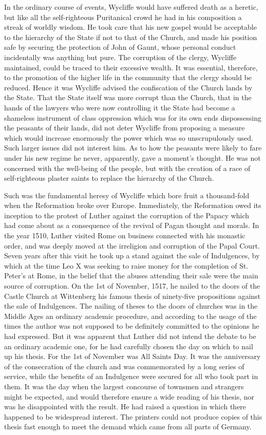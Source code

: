 \documentclass{book}
\begin{document}
In the ordinary course of events, Wycliffe would have suffered death as a heretic, but like all the self-righteous Puritanical crowd he had in his composition a streak of worldly wisdom. He took care that his new gospel would be acceptable to the hierarchy of the State if not to that of the Church, and made his position safe by securing the protection of John of Gaunt, whose personal conduct incidentally was anything but pure. The corruption of the clergy, Wycliffe maintained, could be traced to their excessive wealth. It was essential, therefore, to the promotion of the higher life in the community that the clergy should be reduced. Hence it was Wycliffe advised the confiscation of the Church lands by the State. That the State itself was more corrupt than the Church, that in the hands of the lawyers who were now controlling it the State had become a shameless instrument of class oppression which was for its own ends dispossessing the peasants of their lands, did not deter Wycliffe from proposing a measure which would increase enormously the power which was so unscrupulously used. Such larger issues did not interest him. As to how the peasants were likely to fare under his new regime he never, apparently, gave a moment’s thought. He was not concerned with the well-being of the people, but with the creation of a race of self-righteous plaster saints to replace the hierarchy of the Church.

Such was the fundamental heresy of Wycliffe which bore fruit a thousand-fold when the Reformation broke over Europe. Immediately, the Reformation owed its inception to the protest of Luther against the corruption of the Papacy which had come about as a consequence of the revival of Pagan thought and morals. In the year 1510, Luther visited Rome on business connected with his monastic order, and was deeply moved at the irreligion and corruption of the Papal Court. Seven years after this visit he took up a stand against the sale of Indulgences, by which at the time Leo X was seeking to raise money for the completion of St. Peter’s at Rome, in the belief that the abuses attending their sale were the main source of corruption. On the 1st of November, 1517, he nailed to the doors of the Castle Church at Wittenberg his famous thesis of ninety-five propositions against the sale of Indulgences. The nailing of theses to the doors of churches was in the Middle Ages an ordinary academic procedure, and according to the usage of the times the author was not supposed to be definitely committed to the opinions he had expressed. But it was apparent that Luther did not intend the debate to be an ordinary academic one, for he had carefully chosen the day on which to nail up his thesis. For the 1st of November was All Saints Day. It was the anniversary of the consecration of the church and was commemorated by a long series of service, while the benefits of an Indulgence were secured for all who took part in them. It was the day when the largest concourse of townsmen and strangers might be expected, and would therefore ensure a wide reading of his thesis, nor was he disappointed with the result. He had raised a question in which there happened to be widespread interest. The printers could not produce copies of this thesis fast enough to meet the demand which came from all parts of Germany.
\end{document}
